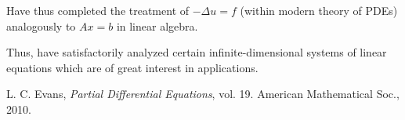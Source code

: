 \documentclass[12pt]{article}
\theoremstyle{definition}
\begin{document}
Have thus completed the treatment of $-\Delta u=f$ (within modern theory of PDEs) analogously to $Ax=b$ in linear algebra.

Thus, have satisfactorily analyzed certain infinite-dimensional systems of linear equations which are of great interest in applications.

\begin{thebibliography}{1}
 L. C. Evans, \emph{Partial Differential Equations}, vol. 19. American Mathematical Soc., 2010.
\end{thebibliography}
\end{document}

